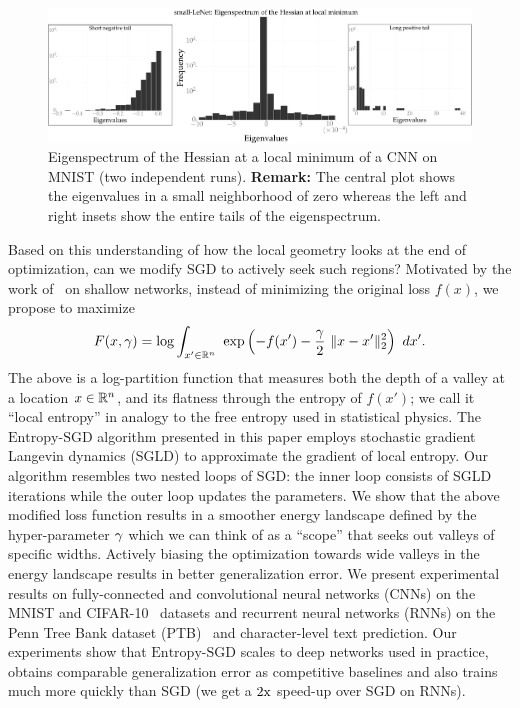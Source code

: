 \documentclass[10pt]{article}
\newcommand{\entropysgd}{\mathrm{Entropy}\textrm{-}\mathrm{SGD}}
\begin{document}
\begin{figure}[tbh]
\vspace*{-0.1in}
\centering
\includegraphics[width=\textwidth]{lenet_hessian.pdf}
\caption{\small Eigenspectrum of the Hessian at a local minimum of a CNN on MNIST (two independent runs). \textbf{Remark:} The central plot shows the eigenvalues in a small neighborhood of zero whereas the left and right insets show the entire tails of the eigenspectrum.}
\label{fig:lenet_hessian}
\end{figure}

Based on this understanding of how the local geometry looks at the end of optimization, can we modify SGD to actively seek such regions? Motivated by the work of~\citet{baldassi2015subdominant} on shallow networks, instead of minimizing the original loss $f(x)$, we propose to maximize
$$
F(x, \g) = \log \int_{x' \in \reals^n}\ \exp \rbrac{-f(x') - \f{\g}{2}\ \norm{x-x'}^2_2}\ dx'.
$$
The above is a log-partition function that measures both the depth of a valley at a location  $x \in \mathbb{R}^n$, and its flatness through the entropy of $f(x')$; we call it ``local entropy'' in analogy to the free entropy used in statistical physics. The $\entropysgd$ algorithm presented in this paper employs stochastic gradient Langevin dynamics (SGLD) to approximate the gradient of local entropy. Our algorithm resembles two nested loops of SGD: the inner loop consists of SGLD iterations while the outer loop updates the parameters. We show that the above modified loss function results in a smoother energy landscape defined by the hyper-parameter $\gamma$ which we can think of as a ``scope'' that seeks out valleys of specific widths. Actively biasing the optimization towards wide valleys in the energy landscape results in better generalization error. We present experimental results on fully-connected and convolutional neural networks (CNNs) on the MNIST and CIFAR-10~\citep{krizhevsky2009learning} datasets and recurrent neural networks (RNNs) on the Penn Tree Bank dataset (PTB)~\citep{marcus1993building} and character-level text prediction. Our experiments show that $\entropysgd$ scales to deep networks used in practice, obtains comparable generalization error as competitive baselines and also trains much more quickly than SGD (we get a $2\mathrm{x}$ speed-up over SGD on RNNs).
\end{document}
